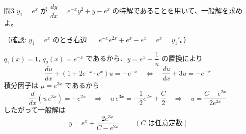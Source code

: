 \documentclass[a4paper,11pt]{article}
\begin{document}
\clearpage
\begin{mondaiboxS}{問3}
$y_{1} = e^{x}$ が $\dfrac{dy}{dx} = e^{-x}y^{2} + y - e^{x}$ の特解であることを用いて、一般解を求めよ。
\end{mondaiboxS}
\kaitou
（確認: $y_{1} = e^{x}$ のとき右辺 $= e^{-x}e^{2x} + e^{x} - e^{x} = e^{x} = y_{1}'$。）

$q_{1}(x) = 1$, $q_{2}(x) = e^{-x}$ であるから、$y = e^{x} + \dfrac{1}{u}$ の置換により
\[
\frac{du}{dx} + \left(1 + 2e^{-x}\cdot e^{x}\right)u = -e^{-x}
\quad\Longleftrightarrow\quad
\frac{du}{dx} + 3u = -e^{-x}
\]
積分因子は $\mu = e^{3x}$ であるから
\[
\frac{d}{dx}\left(u\,e^{3x}\right) = -e^{2x}
\quad\Longrightarrow\quad
u\,e^{3x} = -\frac{1}{2}e^{2x} + \frac{C}{2}
\quad\Longrightarrow\quad
u = \frac{C - e^{2x}}{2e^{3x}}
\]
したがって一般解は
\[
\boxed{\; y = e^{x} + \frac{2e^{3x}}{C - e^{2x}} \;}
\qquad (C \text{ は任意定数})
\]
\end{document}
